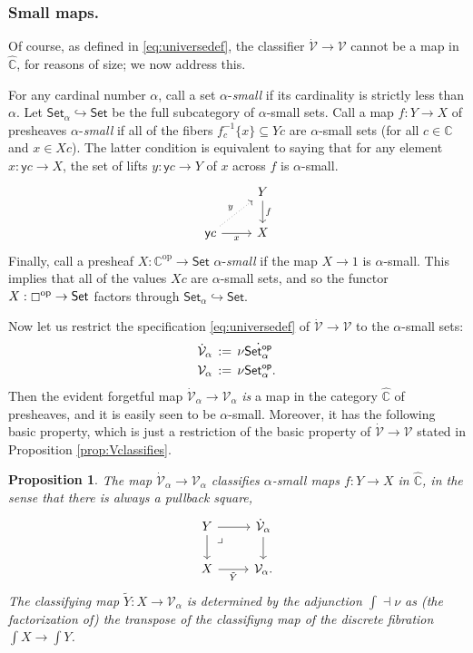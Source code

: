 \documentclass[11pt,reqno]{amsart}
\newcommand{\C}{\ensuremath{\boxempty}}
\newcommand{\bbC}{\ensuremath{\mathbb{C}}}
\newcommand{\Set}{\ensuremath{\mathsf{Set}}}
\newcommand{\y}{\ensuremath{\mathsf{y}}} %
\newcommand{\op}[1]{\ensuremath{{#1}^{\mathrm{op}}}}
\newcommand{\hook}{\ensuremath{\hookrightarrow}}
\renewcommand{\to}{\ensuremath{\rightarrow}}
\newcommand{\elem}[1]{\textstyle\int\!{#1}}%
\newcommand{\V}{\ensuremath{\mathcal{V}}}
\newcommand{\VV}{\ensuremath{\dot{\mathcal{V}}}}
\newtheorem{proposition}[theorem]{Proposition}
\theoremstyle{remark}
\theoremstyle{definition}
\newcommand{\pbmark}{\ar[dr, phantom, "\lrcorner" very near start, shift right=.5ex]}	%
\begin{document}
\subsubsection*{Small maps.}
 
Of course, as defined in \eqref{eq:universedef}, the classifier $\VV\to\V$ cannot be a map in $\widehat{\bbC}$, for reasons of size; we now address this.  


For any cardinal number $\alpha$, call a set $\alpha$-\emph{small} if its cardinality is strictly less than $\alpha$.  Let $\Set_\alpha\hook\Set$ be the full subcategory of $\alpha$-small sets.  
Call a map $f:Y\to X$ of presheaves $\alpha$-\emph{small} if all of the fibers $f_c^{-1}\{ x\} \subseteq Yc$ are $\alpha$-small sets (for all $c\in\bbC$ and $x\in Xc$). The latter condition is equivalent to saying that for any element $x:\y{c} \to X$, the set of lifts $y:\y{c} \to Y$ of $x$ across $f$ is $\alpha$-small.
\begin{equation}\label{eq:smallmap}\textstyle
\begin{tikzcd}
	& Y \ar[d, "f"] \\  
	\y{c} \ar[r,swap,"x"] \ar[ru, dotted, "y"] &  X
 \end{tikzcd}
 \end{equation}
Finally, call a presheaf $X : \op{\bbC} \to \Set$ $\alpha$-\emph{small} if the map $X\to 1$ is $\alpha$-small.  This implies that all of the values $Xc$ are $\alpha$-small sets, and so the functor $X : \op{\C} \to \Set$ factors through $\Set_\alpha\hook\Set$. 

Now let us restrict the specification \eqref{eq:universedef} of $\VV\to\V$ to the $\alpha$-small sets:
\begin{align}\label{eq:universedefalpha}\textstyle
\VV_\alpha\, &:=\, \nu \dot{\Set^{\mathsf{op}}_\alpha}\\  
\V_\alpha\, &:=\, \nu \Set^{\mathsf{op}}_\alpha. \notag
 \end{align}
Then the evident forgetful map $\VV_\alpha\to\V_\alpha$ \emph{is} a map in the category $\widehat{\bbC}$ of presheaves, and it is easily seen to be $\alpha$-small. Moreover, it has the following basic property, which is just a restriction of the basic property of $\VV\to\V$ stated in Proposition \ref{prop:Vclassifies}.

 \begin{proposition}\label{prop:familyclassifier}
The map $\VV_\alpha\to\V_\alpha$ classifies $\alpha$-small maps $f:Y\to X$ in $\widehat{\bbC}$, in the sense that there is always a pullback square,
\begin{equation}\label{eq:classifyuniversefamilyalpha}\textstyle
\begin{tikzcd}
	 Y \ar[d] \pbmark \ar[r] & \VV_\alpha \ar[d] \\  
	X \ar[r,swap, "\tilde{Y}"] &  \V_\alpha.
 \end{tikzcd}
 \end{equation}
The classifying map $\tilde{Y} : X\to \V_\alpha$ is determined by the adjunction $\int \dashv \nu$ as (the factorization of) the transpose of the classifiyng map of the discrete fibration $\elem X\to\elem Y$. 
\end{proposition}
\end{document}
